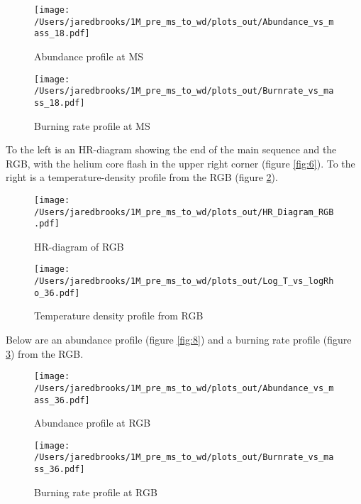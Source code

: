 \documentclass{article}
\begin{document}
        \begin{figure}[H]
          \begin{minipage}[b]{0.5\linewidth}
	    \centering
	    \texttt{[image: /Users/jaredbrooks/1M\_pre\_ms\_to\_wd/plots\_out/Abundance\_vs\_mass\_18.pdf]}
	    \caption{Abundance profile at MS}
	    \label{fig:4}
          \end{minipage}
          \hspace{0cm}
          \begin{minipage}[b]{0.5\linewidth}
            \centering
            \texttt{[image: /Users/jaredbrooks/1M\_pre\_ms\_to\_wd/plots\_out/Burnrate\_vs\_mass\_18.pdf]}
            \caption{Burning rate profile at MS}
            \label{fig:5}
          \end{minipage}
	\end{figure}

        \pagebreak

        To the left is an HR-diagram showing the end of the main sequence and the RGB, with the helium core flash in the upper right corner (figure \ref{fig:6}).  To the right is a temperature-density profile from the RGB (figure \ref{fig:7}).

        \begin{figure}[H]
          \begin{minipage}[b]{0.5\linewidth}
            \centering
            \texttt{[image: /Users/jaredbrooks/1M\_pre\_ms\_to\_wd/plots\_out/HR\_Diagram\_RGB.pdf]}
            \caption{HR-diagram of RGB}
            \label{fig:6}
          \end{minipage}
          \hspace{0cm}
          \begin{minipage}[b]{0.5\linewidth}
            \centering
            \texttt{[image: /Users/jaredbrooks/1M\_pre\_ms\_to\_wd/plots\_out/Log\_T\_vs\_logRho\_36.pdf]}
            \caption{Temperature density profile from RGB}
            \label{fig:7}
          \end{minipage}
        \end{figure}

        Below are an abundance profile (figure \ref{fig:8}) and a burning rate profile (figure \ref{fig:9}) from the RGB.

        \begin{figure}[H]
          \begin{minipage}[b]{0.5\linewidth}
	    \centering
	    \texttt{[image: /Users/jaredbrooks/1M\_pre\_ms\_to\_wd/plots\_out/Abundance\_vs\_mass\_36.pdf]}
	    \caption{Abundance profile at RGB}
	    \label{fig:8}
          \end{minipage}
          \hspace{0cm}
          \begin{minipage}[b]{0.5\linewidth}
            \centering
            \texttt{[image: /Users/jaredbrooks/1M\_pre\_ms\_to\_wd/plots\_out/Burnrate\_vs\_mass\_36.pdf]}
            \caption{Burning rate profile at RGB}
            \label{fig:9}
          \end{minipage}
	\end{figure}
\end{document}
